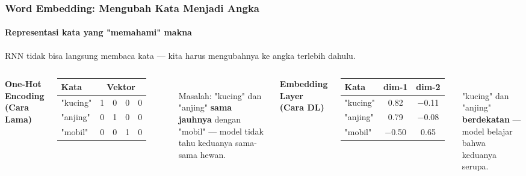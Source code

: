 \documentclass[t,aspectratio=169,xcolor=dvipsnames]{beamer}
\begin{document}
\begin{frame}
    \frametitle{Word Embedding: Mengubah Kata Menjadi Angka}
    \framesubtitle{Representasi kata yang "memahami" makna}
    \small
    RNN tidak bisa langsung membaca kata — kita harus mengubahnya ke angka terlebih dahulu.

    \vspace{0.3em}
    \begin{columns}[T]
        \textbf{One-Hot Encoding (Cara Lama)}\\[0.3em]
        \footnotesize
        \begin{tabular}{lcccc}
            \toprule
            Kata & \multicolumn{4}{c}{Vektor} \\
            \midrule
            "kucing" & 1 & 0 & 0 & 0 \\
            "anjing" & 0 & 1 & 0 & 0 \\
            "mobil"  & 0 & 0 & 1 & 0 \\
            \bottomrule
        \end{tabular}\\[0.4em]
        Masalah: "kucing" dan "anjing" \textbf{sama jauhnya} dengan "mobil" — model tidak tahu keduanya sama-sama hewan.

        \textbf{Embedding Layer (Cara DL)}\\[0.3em]
        \footnotesize
        \begin{tabular}{lcc}
            \toprule
            Kata & dim-1 & dim-2 \\
            \midrule
            "kucing" & 0.82 & $-$0.11 \\
            "anjing" & 0.79 & $-$0.08 \\
            "mobil"  & $-$0.50 & 0.65 \\
            \bottomrule
        \end{tabular}\\[0.4em]
        "kucing" dan "anjing" \textbf{berdekatan} — model belajar bahwa keduanya serupa.
    \end{columns}
\end{frame}
\end{document}

